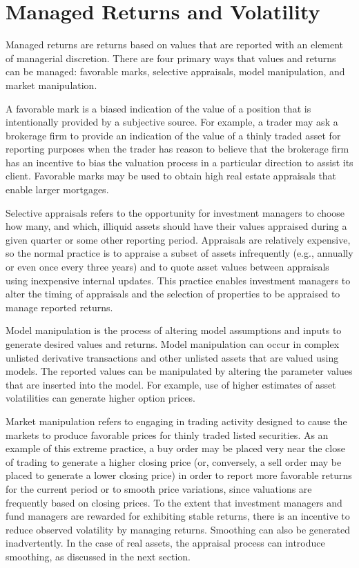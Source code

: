 \documentclass[11pt]{article}
\begin{document}
\section*{Managed Returns and Volatility}
Managed returns are returns based on values that are reported with an element of managerial discretion. There are four primary ways that values and returns can be managed: favorable marks, selective appraisals, model manipulation, and market manipulation.

A favorable mark is a biased indication of the value of a position that is intentionally provided by a subjective source. For example, a trader may ask a brokerage firm to provide an indication of the value of a thinly traded asset for reporting purposes when the trader has reason to believe that the brokerage firm has an incentive to bias the valuation process in a particular direction to assist its client. Favorable marks may be used to obtain high real estate appraisals that enable larger mortgages.

Selective appraisals refers to the opportunity for investment managers to choose how many, and which, illiquid assets should have their values appraised during a given quarter or some other reporting period. Appraisals are relatively expensive, so the normal practice is to appraise a subset of assets infrequently (e.g., annually or even once every three years) and to quote asset values between appraisals using inexpensive internal updates. This practice enables investment managers to alter the timing of appraisals and the selection of properties to be appraised to manage reported returns.

Model manipulation is the process of altering model assumptions and inputs to generate desired values and returns. Model manipulation can occur in complex unlisted derivative transactions and other unlisted assets that are valued using models. The reported values can be manipulated by altering the parameter values that are inserted into the model. For example, use of higher estimates of asset volatilities can generate higher option prices.

Market manipulation refers to engaging in trading activity designed to cause the markets to produce favorable prices for thinly traded listed securities. As an example of this extreme practice, a buy order may be placed very near the close of trading to generate a higher closing price (or, conversely, a sell order may be placed to generate a lower closing price) in order to report more favorable returns for the current period or to smooth price variations, since valuations are frequently based on closing prices. To the extent that investment managers and fund managers are rewarded for exhibiting stable returns, there is an incentive to reduce observed volatility by managing returns. Smoothing can also be generated inadvertently. In the case of real assets, the appraisal process can introduce smoothing, as discussed in the next section.
\end{document}
